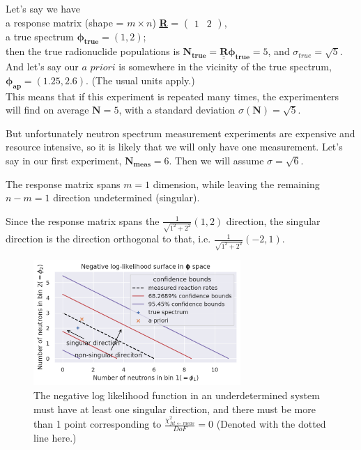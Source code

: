 \documentclass[a4paper, 12pt]{article}
\newcommand{\matr}[1]{\underline{\underline{\textbf{#1}}}}
\newcommand{\ve}[1]{\boldsymbol{#1}}
\newcommand{\apriori}{\textit{a priori}}
\newcommand{\chifit}{\frac{\chi^2_{fit\leftarrow meas}}{DoF} }
\begin{document}
Let's say we have\\a response matrix (shape = $m \times n$) \matr{R} = 
$
\begin{pmatrix}
1 & 2
\end{pmatrix}
$, \\
a true spectrum $\ve{\phi_{true}}=(1,2)$;\\
then the true radionuclide populations is $\ve{N_{true}}=\matr{R}\ve{\phi_{true}}=5$,
and $\sigma_{true}=\sqrt{5}$.\\
And let's say our $\apriori$ is somewhere in the vicinity of the true spectrum, $\ve{\phi_{ap}}=(1.25, 2.6)$.
(The usual units apply.)\\

This means that if this experiment is repeated many times, the experimenters will find on average $\ve{N}=5$, with a standard deviation $\sigma(\ve{N})=\sqrt{5}$.

But unfortunately neutron spectrum measurement experiments are expensive and resource intensive, so it is likely that we will only have one measurement. Let's say in our first experiment, $\ve{N_{meas}}=6$. Then we will assume $\sigma=\sqrt{6}$.

The response matrix spans $m=1$ dimension, while leaving the remaining $n-m=1$ direction undetermined (singular).

Since the response matrix spans the $\frac{1}{\sqrt{1^2+2^2}}(1,2)$ direction, the singular direction is the direction orthogonal to that, i.e. $\frac{1}{\sqrt{1^2+2^2}} (-2,1)$.

\begin{figure}[H]
\centering
\includegraphics[width=0.7\textwidth]{Singular_log_likelihood.png}
\caption{The negative log likelihood function in an underdetermined system must have at least one singular direction, and there must be more than 1 point corresponding to $\chifit=0$ (Denoted with the dotted line here.)}\label{Singular_log_likelihood}
\end{figure}
\end{document}
